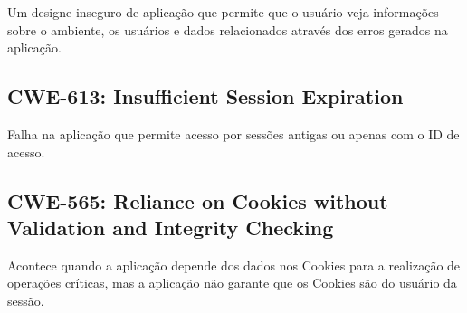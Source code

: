 Um designe inseguro de aplicação que permite que o usuário veja informações sobre o ambiente, os usuários e dados relacionados através dos erros gerados na aplicação.

\subsection{CWE-613: Insufficient Session Expiration}

Falha na aplicação que permite acesso por sessões antigas ou apenas com o ID de acesso.

\subsection{CWE-565: Reliance on Cookies without Validation and Integrity Checking}

Acontece quando a aplicação depende dos dados nos Cookies para a realização de operações críticas, mas a aplicação não garante que os Cookies são do usuário da sessão.